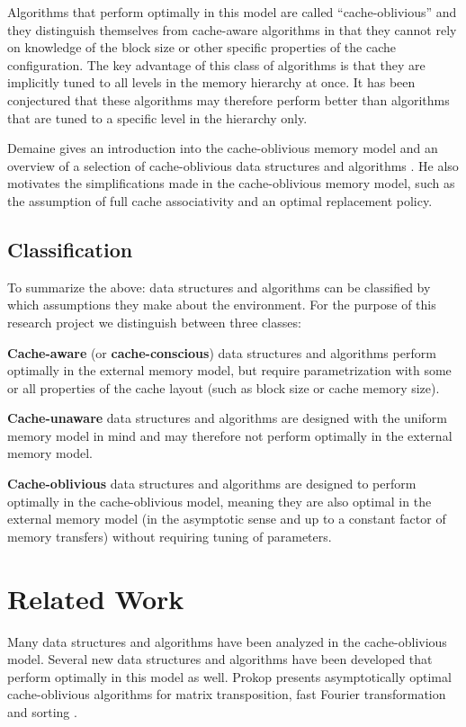 \documentclass{acm_proc_article-sp}
\begin{document}
Algorithms that perform optimally in this model are called ``cache-oblivious'' and they distinguish themselves from cache-aware algorithms in that they cannot rely on knowledge of the block size or other specific properties of the cache configuration. The key advantage of this class of algorithms is that they are implicitly tuned to all levels in the memory hierarchy at once. It has been conjectured that these algorithms may therefore perform better than algorithms that are tuned to a specific level in the hierarchy only.

Demaine gives an introduction into the cache-oblivious memory model and an overview of a selection of cache-oblivious data structures and algorithms \cite{demaine2002coa}. He also motivates the simplifications made in the cache-oblivious memory model, such as the assumption of full cache associativity and an optimal replacement policy.

\subsection{Classification}
To summarize the above: data structures and algorithms can be classified by which assumptions they make about the environment. For the purpose of this research project we distinguish between three classes:
\begin{list}{}{}
\item \textbf{Cache-aware} (or \textbf{cache-conscious}) data structures and algorithms perform optimally in the external memory model, but require parametrization with some or all properties of the cache layout (such as block size or cache memory size).
\item \textbf{Cache-unaware} data structures and algorithms are designed with the uniform memory model in mind and may therefore not perform optimally in the external memory model.
\item \textbf{Cache-oblivious} data structures and algorithms are designed to perform optimally in the cache-oblivious model, meaning they are also optimal in the external memory model (in the asymptotic sense and up to a constant factor of memory transfers) without requiring tuning of parameters.
\end{list}

\section{Related Work}
Many data structures and algorithms have been analyzed in the cache-oblivious model. Several new data structures and algorithms have been developed that perform optimally in this mo\-del as well. Prokop presents asymptotically optimal cache-oblivious algorithms for matrix transposition, fast Fourier transformation and sorting \cite{prokop1999coa}.
\end{document}

